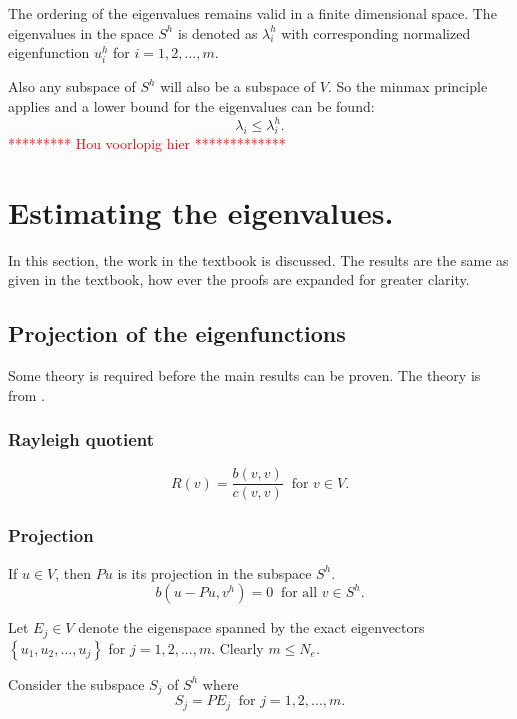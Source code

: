\documentclass[../../main.tex]{subfiles}
\begin{document}
The ordering of the eigenvalues remains valid in a finite dimensional space. The eigenvalues in the space $S^h$ is denoted as $\lambda_i^h$ with corresponding normalized eigenfunction $u^h_i$ for $i = 1,2,...,m$.

Also any subspace of $S^h$ will also be a subspace of $V$. So the minmax principle applies and a lower bound for the eigenvalues can be found:
\begin{equation}
	\lambda_i \leq \lambda_i^h.
\end{equation}
\textcolor{red}{********* Hou voorlopig hier *************}

\section{Estimating the eigenvalues.} \label{sec:estimating_the_eigenvalues}
In this section, the work in the textbook \cite{SF73} is discussed. The results are the same as given in the textbook, how ever the proofs are expanded for greater clarity.

\subsection{Projection of the eigenfunctions}

Some theory is required before the main results can be proven. The theory is from \cite{SF73}.

\subsubsection*{Rayleigh quotient}
\begin{equation}
	R(v) = \frac{b(v,v)}{c(v,v)} \ \text { for } v \in V. \label{Rayleigh}
\end{equation} \label{sym:Rayleigh}

\subsubsection*{Projection}
If $u \in V$, then $Pu$ is its projection in the subspace $S^h$.
\begin{equation*}
	b(u-Pu,v^h) = 0 \ \text{ for all } v \in S^h.
\end{equation*}

Let $E_j \in V$ denote the eigenspace spanned by the exact eigenvectors $\left\{u_1,u_2,...,u_j \right\}$ for $j = 1,2,...,m$. Clearly $m \leq N_e$.

Consider the subspace $S_j$ of $S^h$ where
\begin{equation*}
	S_j = PE_j \ \text{ for } j = 1,2,...,m.
\end{equation*} 
\end{document}
